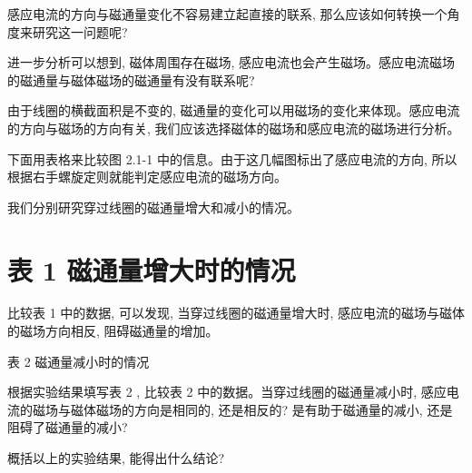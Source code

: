 \documentclass[10pt]{article}
\begin{document}
感应电流的方向与磁通量变化不容易建立起直接的联系, 那么应该如何转换一个角度来研究这一问题呢?

进一步分析可以想到, 磁体周围存在磁场, 感应电流也会产生磁场。感应电流磁场的磁通量与磁体磁场的磁通量有没有联系呢?

由于线圈的横截面积是不变的, 磁通量的变化可以用磁场的变化来体现。感应电流的方向与磁场的方向有关, 我们应该选择磁体的磁场和感应电流的磁场进行分析。

下面用表格来比较图 2.1-1 中的信息。由于这几幅图标出了感应电流的方向, 所以根据右手螺旋定则就能判定感应电流的磁场方向。

我们分别研究穿过线圈的磁通量增大和减小的情况。

\section*{表 1 磁通量增大时的情况}

\begin{center}
\end{center}

比较表 1 中的数据, 可以发现, 当穿过线圈的磁通量增大时, 感应电流的磁场与磁体的磁场方向相反, 阻碍磁通量的增加。

表 2 磁通量减小时的情况

\begin{center}
\end{center}

根据实验结果填写表 2 , 比较表 2 中的数据。当穿过线圈的磁通量减小时, 感应电流的磁场与磁体磁场的方向是相同的, 还是相反的? 是有助于磁通量的减小, 还是阻碍了磁通量的减小?

概括以上的实验结果, 能得出什么结论?
\end{document}
